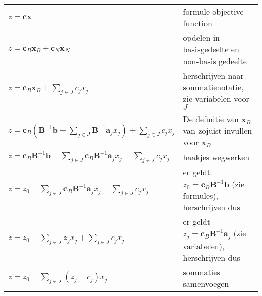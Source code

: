 \documentclass[10pt,a4paper]{article}
\begin{document}
\begin{description}
\begin{tabular}{l l}
$z = \textbf{cx}$ & formule objective function \\
$z = \textbf{c}_B \textbf{x}_B + \textbf{c}_N \textbf{x}_N$ & opdelen in basisgedeelte en non-basis gedeelte \\
$z = \textbf{c}_B \textbf{x}_B + \displaystyle\sum\limits_{j \in J}c_j x_j$ & herschrijven naar sommatienotatie, zie variabelen voor $J$ \\
$z = \textbf{c}_B (\textbf{B}^{-1}\textbf{b} - \displaystyle\sum\limits_{j \in J}\textbf{B}^ {-1}\textbf{a}_j x_j) + \displaystyle\sum\limits_{j \in J}c_j x_j$ & De definitie van $\textbf{x}_B$ van zojuist invullen voor $\textbf{x}_B$ \\
$z = \textbf{c}_B \textbf{B}^{-1}\textbf{b} - \displaystyle\sum\limits_{j \in J}\textbf{c}_B \textbf{B}^ {-1}\textbf{a}_j x_j + \displaystyle\sum\limits_{j \in J}c_j x_j$ & haakjes wegwerken \\
$z = z_0 - \displaystyle\sum\limits_{j \in J}\textbf{c}_B \textbf{B}^ {-1}\textbf{a}_j x_j + \displaystyle\sum\limits_{j \in J}c_j x_j$ & er geldt $z_0 = \textbf{c}_B\textbf{B}^{-1}\textbf{b}$ (zie formules), herschrijven dus \\
$z = z_0 - \displaystyle\sum\limits_{j \in J}z_j x_j + \displaystyle\sum\limits_{j \in J}c_j x_j$ & er geldt $z_j = \textbf{c}_B \textbf{B}^ {-1}\textbf{a}_j$ (zie variabelen), herschrijven dus \\
$z = z_0 - \displaystyle\sum\limits_{j \in J}(z_j - c_j) x_j$ & sommaties samenvoegen \\
\end{tabular}



\end{description}
\end{document}
